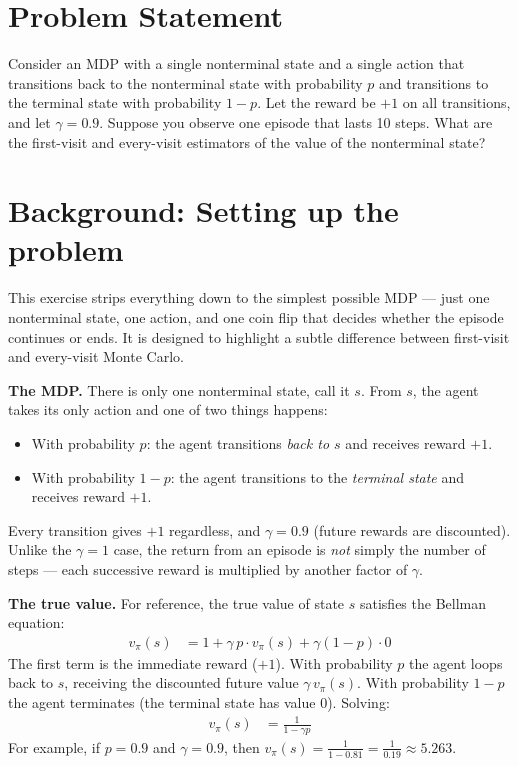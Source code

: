 \documentclass[11pt]{article}
\begin{document}
\section*{Problem Statement}

Consider an MDP with a single nonterminal state and a single action that transitions back to the nonterminal state with probability $p$ and transitions to the terminal state with probability $1 - p$. Let the reward be $+1$ on all transitions, and let $\gamma = 0.9$. Suppose you observe one episode that lasts 10 steps. What are the first-visit and every-visit estimators of the value of the nonterminal state?

\section*{Background: Setting up the problem}

This exercise strips everything down to the simplest possible MDP --- just one nonterminal state, one action, and one coin flip that decides whether the episode continues or ends. It is designed to highlight a subtle difference between first-visit and every-visit Monte Carlo.

\textbf{The MDP.} There is only one nonterminal state, call it $s$. From $s$, the agent takes its only action and one of two things happens:
\begin{itemize}[nosep]
    \item With probability $p$: the agent transitions \textit{back to $s$} and receives reward $+1$.
    \item With probability $1 - p$: the agent transitions to the \textit{terminal state} and receives reward $+1$.
\end{itemize}

Every transition gives $+1$ regardless, and $\gamma = 0.9$ (future rewards are discounted). Unlike the $\gamma = 1$ case, the return from an episode is \textit{not} simply the number of steps --- each successive reward is multiplied by another factor of $\gamma$.

\textbf{The true value.} For reference, the true value of state $s$ satisfies the Bellman equation:
\begin{align}
    v_\pi(s) &= 1 + \gamma \, p \cdot v_\pi(s) + \gamma (1-p) \cdot 0
\end{align}
The first term is the immediate reward ($+1$). With probability $p$ the agent loops back to $s$, receiving the discounted future value $\gamma \, v_\pi(s)$. With probability $1 - p$ the agent terminates (the terminal state has value 0). Solving:
\begin{align}
    v_\pi(s) &= \frac{1}{1 - \gamma p}
\end{align}
For example, if $p = 0.9$ and $\gamma = 0.9$, then $v_\pi(s) = \frac{1}{1 - 0.81} = \frac{1}{0.19} \approx 5.263$.
\end{document}
